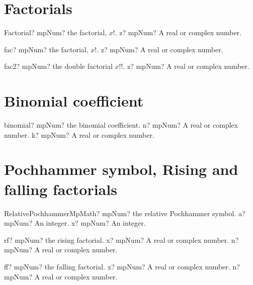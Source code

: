 \documentclass[12pt,a4paper,openany]{book}
\begin{document}
\section{Factorials}

\begin{mpFunctionsExtract}
\mpFunctionOne
{Factorial? mpNum? the factorial, $x!$.}
{z? mpNum? A real or complex number.}
\end{mpFunctionsExtract}

\begin{mpFunctionsExtract}
\mpFunctionOne
{fac? mpNum? the factorial, $x!$.}
{z? mpNum? A real or complex number.}
\end{mpFunctionsExtract}

\begin{mpFunctionsExtract}
\mpFunctionOne
{fac2? mpNum? the double factorial $x!!$.}
{z? mpNum? A real or complex number.}
\end{mpFunctionsExtract}

\section{Binomial coefficient}

\begin{mpFunctionsExtract}
\mpFunctionTwo
{binomial? mpNum? the binomial coefficient.}
{n? mpNum? A real or complex number.}
{k? mpNum? A real or complex number.}
\end{mpFunctionsExtract}

\section{Pochhammer symbol, Rising and falling factorials}

\begin{mpFunctionsExtract}
\mpFunctionTwoNotImplemented
{RelativePochhammerMpMath? mpNum? the relative Pochhammer symbol.}
{a? mpNum? An integer.}
{x? mpNum? An integer.}
\end{mpFunctionsExtract}

\begin{mpFunctionsExtract}
\mpFunctionTwo
{rf? mpNum? the rising factorial.}
{x? mpNum? A real or complex number.}
{n? mpNum? A real or complex number.}
\end{mpFunctionsExtract}

\begin{mpFunctionsExtract}
\mpFunctionTwo
{ff? mpNum? the falling factorial.}
{x? mpNum? A real or complex number.}
{n? mpNum? A real or complex number.}
\end{mpFunctionsExtract}
\end{document}

